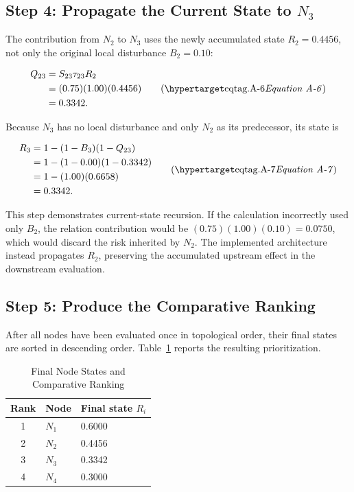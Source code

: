\subsection{Step 4: Propagate the Current State to
\texorpdfstring{\(N_3\)}{N3}}

The contribution from \(N_2\) to \(N_3\) uses the newly accumulated state
\(R_2=0.4456\), not only the original local disturbance \(B_2=0.10\):

\[
\begin{aligned}
Q_{23}
  &=S_{23}\tau_{23}R_2 \\
  &=(0.75)(1.00)(0.4456) \\
  &=0.3342.
\end{aligned}
\eqtag{A-6}
\]

Because \(N_3\) has no local disturbance and only \(N_2\) as its
predecessor, its state is

\[
\begin{aligned}
R_3
  &=1-(1-B_3)(1-Q_{23}) \\
  &=1-(1-0.00)(1-0.3342) \\
  &=1-(1.00)(0.6658) \\
  &=0.3342.
\end{aligned}
\eqtag{A-7}
\]

This step demonstrates current-state recursion. If the calculation incorrectly
used only \(B_2\), the relation contribution would be
\((0.75)(1.00)(0.10)=0.0750\), which would discard the risk inherited by
\(N_2\). The implemented architecture instead propagates \(R_2\), preserving
the accumulated upstream effect in the downstream evaluation.

\subsection{Step 5: Produce the Comparative Ranking}

After all nodes have been evaluated once in topological order, their final
states are sorted in descending order. Table~\ref{tab:appendix-final-ranking}
reports the resulting prioritization.

\begin{table}[H]
\caption{Final Node States and Comparative Ranking}
\label{tab:appendix-final-ranking}
\centering
\begin{tabular*}{0.72\textwidth}{@{\extracolsep{\fill}}cll}
\toprule
Rank & Node & Final state \(R_i\) \\
\midrule
1 & \(N_1\) & 0.6000 \\
2 & \(N_2\) & 0.4456 \\
3 & \(N_3\) & 0.3342 \\
4 & \(N_4\) & 0.3000 \\
\bottomrule
\end{tabular*}
\end{table}

